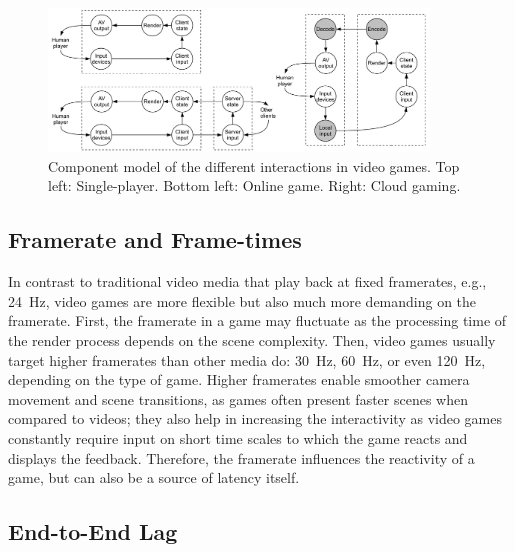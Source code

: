 
\begin{figure}[!t]
  \centering
  \includegraphics[width=0.9\textwidth]{../models/component_interaction_full.pdf}
  \caption{Component model of the different interactions in video games. Top left: Single-player. Bottom left: Online game. Right: Cloud gaming.}
  \label{fig:component-models}
\end{figure}

\subsection{Framerate and Frame-times}
\label{sec:framerate}

In contrast to traditional video media that play back at fixed 
framerates, e.g., \SI{24}{\hertz}, video games are more flexible 
but also much more demanding on the framerate. First, the framerate 
in a game may fluctuate as the processing time of the render process 
depends on the scene complexity.
Then, video games usually target higher framerates than other media do: 
\SI{30}{\hertz}, \SI{60}{\hertz}, or even \SI{120}{\hertz}, depending on 
the type of game. Higher framerates enable smoother camera movement and 
scene transitions, as games often present faster scenes when compared 
to videos; they also help in increasing the interactivity as video games 
constantly require input on short time scales to which the game reacts 
and displays the feedback. Therefore, the framerate 
influences the reactivity of a game, but can also be a source 
of latency itself.


\subsection{End-to-End Lag}\label{subsec:e2e-lag}

